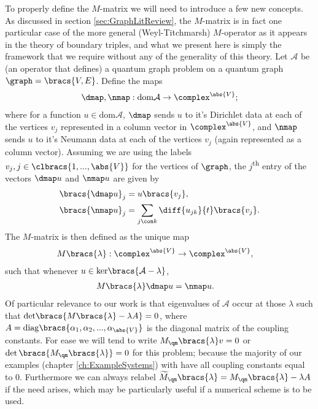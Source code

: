 To properly define the $M$-matrix we will need to introduce a few new concepts.
As discussed in section \ref{sec:GraphLitReview}, the $M$-matrix is in fact one particular case of the more general (Weyl-Titchmarsh) $M$-operator as it appears in the theory of boundary triples, and what we present here is simply the framework that we require without any of the generality of this theory.
Let $\mathcal{A}$ be (an operator that defines) a quantum graph problem on a quantum graph $\graph=\bracs{V,E}$.
Define the maps
\begin{align*}
	\dmap, \nmap: \mathrm{dom}\mathcal{A} \rightarrow \complex^{\abs{V}};
\end{align*}
where for a function $u\in\mathrm{dom}\mathcal{A}$, $\dmap$ sends $u$ to it's Dirichlet data at each of the vertices $v_j$ represented in a column vector in $\complex^{\abs{V}}$, and $\nmap$ sends $u$ to it's Neumann data at each of the vertices $v_j$ (again represented as a column vector).
Assuming we are using the labels $v_j, j\in\clbracs{1,...,\abs{V}}$ for the vertices of $\graph$, the $j$\textsuperscript{th} entry of the vectors $\dmap u$ and $\nmap u$ are given by
\begin{align*}
	\bracs{\dmap u}_j &= u\bracs{v_j}, \\
	\bracs{\nmap u}_j &= \sum_{j\con k}\diff{u_{jk}}{t}\bracs{v_j}.
\end{align*}
The $M$-matrix is then defined as the unique map
\begin{align*}
	M\bracs{\lambda}:\complex^{\abs{V}} &\rightarrow \complex^{\abs{V}},
\end{align*}
such that whenever $u\in\mathrm{ker}\bracs{\mathcal{A}-\lambda}$,
\begin{align*}
	M\bracs{\lambda}\dmap u &= \nmap u.
\end{align*}
Of particular relevance to our work is that eigenvalues of $\mathcal{A}$ occur at those $\lambda$ such that $\mathrm{det}\bracs{M\bracs{\lambda} -\lambda A}= 0$, where $A = \mathrm{diag}\bracs{\alpha_1, \alpha_2, ... , \alpha_{\abs{V}}}$ is the diagonal matrix of the coupling constants.
For ease we will tend to write $M_{\qm}\bracs{\lambda}v=0$ or $\det\bracs{M_{\qm}\bracs{\lambda}}=0$ for this problem; because the majority of our examples (chapter \ref{ch:ExampleSystems}) with have all coupling constants equal to 0.
Furthermore we can always relabel $\widetilde{M}_{\qm}\bracs{\lambda} = M_{\qm}\bracs{\lambda}-\lambda A$ if the need arises, which may be particularly useful if a numerical scheme is to be used. 

